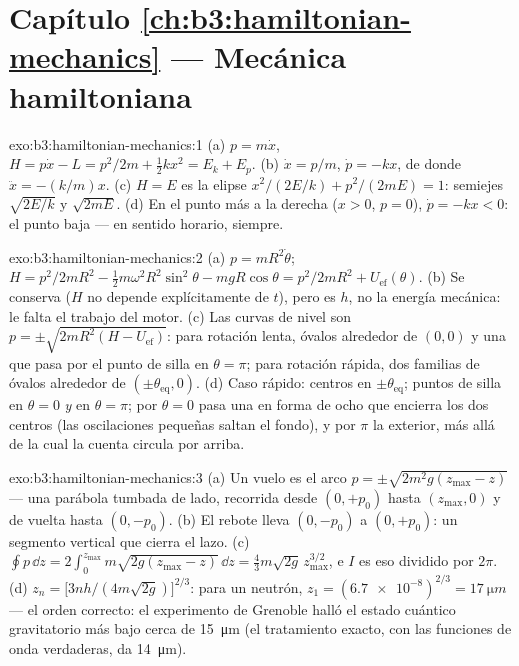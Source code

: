 \section*{Capítulo \ref{ch:b3:hamiltonian-mechanics} --- Mecánica hamiltoniana}

\begin{solution}{exo:b3:hamiltonian-mechanics:1}
(a) $p = m\dot x$, $H = p\dot x - L = p^2/2m + \tfrac12 kx^2 = E_k +
E_p$. (b) $\dot x = p/m$, $\dot p = -kx$, de donde $\ddot x = -(k/m)x$.
(c) $H = E$ es la elipse $x^2/(2E/k) + p^2/(2mE) = 1$: semiejes
$\sqrt{2E/k}$ y $\sqrt{2mE}$. (d) En el punto más a la derecha ($x > 0$,
$p = 0$), $\dot p = -kx < 0$: el punto baja --- en sentido horario,
siempre.
\end{solution}

\begin{solution}{exo:b3:hamiltonian-mechanics:2}
(a) $p = mR^2\dot\theta$; $H = p^2/2mR^2 - \tfrac12 m\omega^2R^2
\sin^2\theta - mgR\cos\theta = p^2/2mR^2 + U_{\text{ef}}(\theta)$.
(b) Se conserva ($H$ no depende explícitamente de $t$), pero es $h$, no la
energía mecánica: le falta el trabajo del motor. (c) Las curvas de nivel son
$p = \pm\sqrt{2mR^2(H - U_{\text{ef}})}$: para rotación lenta, óvalos
alrededor de $(0, 0)$ y una  que pasa por el punto de silla en
$\theta = \pi$; para rotación rápida, dos familias de óvalos alrededor de
$(\pm\theta_{\text{eq}}, 0)$. (d) Caso rápido: centros en
$\pm\theta_{\text{eq}}$; puntos de silla en $\theta = 0$ \emph{y} en $\theta =
\pi$; por $\theta = 0$ pasa una  en forma de ocho que
encierra los dos centros (las oscilaciones pequeñas saltan el fondo), y
por $\pi$ la  exterior, más allá de la cual la cuenta circula
por arriba.
\end{solution}

\begin{solution}{exo:b3:hamiltonian-mechanics:3}
(a) Un vuelo es el arco $p = \pm\sqrt{2m^2g(z_{\max} - z)}$ --- una
parábola tumbada de lado, recorrida desde $(0, +p_0)$ hasta
$(z_{\max}, 0)$ y de vuelta hasta $(0, -p_0)$. (b) El rebote lleva
$(0, -p_0)$ a $(0, +p_0)$: un segmento vertical que cierra el lazo. (c)
$\oint p\,\dd z = 2\int_0^{z_{\max}}m\sqrt{2g(z_{\max} - z)}\,\dd z =
\tfrac43 m\sqrt{2g}\,z_{\max}^{3/2}$, e $I$ es eso dividido por $2\pi$. (d)
$z_n = \big[3nh/(4m\sqrt{2g})\big]^{2/3}$: para un neutrón, $z_1 =
(\num{6.7e-8})^{2/3} = \qty{17}{\micro m}$ --- el orden correcto: el
experimento de Grenoble halló el estado cuántico gravitatorio más bajo cerca
de \qty{15}{\micro m} (el tratamiento exacto, con las funciones de onda
verdaderas, da \qty{14}{\micro m}).
\end{solution}

